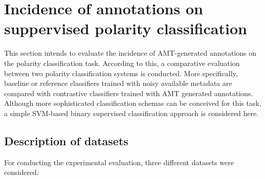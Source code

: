 \documentclass[11pt,letterpaper]{article}
\begin{document}
\section{Incidence of annotations on suppervised polarity classification}
\label{sect:classifier}
This section intends to evaluate the incidence of AMT-generated annotations on the polarity classification task.
According to this, a comparative evaluation between two polarity classification systems is conducted. 
More specifically, baseline or reference classifiers trained with noisy available metadata are compared with 
contrastive classifiers trained with AMT generated annotations.  
Although more sophisticated classification schemas can be conceived for this task, a simple SVM-based binary supervised classification approach is considered here.

\subsection{Description of datasets}
\label{datasets}
For conducting the experimental evaluation, three different datasets were considered:
\end{document}
